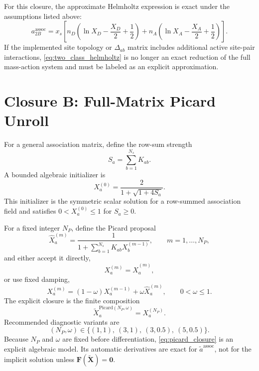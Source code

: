 \documentclass[12pt,letterpaper]{article}
\newcommand{\assoc}{\mathrm{assoc}}
\begin{document}
For this closure, the approximate Helmholtz expression is exact under the
assumptions listed above:
\begin{equation}
  a^\assoc_{2B}
  =
  x_s\left[
    n_D\left(\ln X_D-\frac{X_D}{2}+\frac{1}{2}\right)
    +
    n_A\left(\ln X_A-\frac{X_A}{2}+\frac{1}{2}\right)
  \right].
  \label{eq:two_class_helmholtz}
\end{equation}
If the implemented site topology or \(\Delta_{ab}\) matrix includes additional
active site-pair interactions, \eqref{eq:two_class_helmholtz} is no longer an
exact reduction of the full mass-action system and must be labeled as an
explicit approximation.

\section{Closure B: Full-Matrix Picard Unroll}
\label{sec:closure-b}

For a general association matrix, define the row-sum strength
\begin{equation}
  S_a = \sum_{b=1}^{N_s} K_{ab}.
  \label{eq:row_sum_strength}
\end{equation}
A bounded algebraic initializer is
\begin{equation}
  X_a^{(0)}
  =
  \frac{2}{1+\sqrt{1+4S_a}}.
  \label{eq:row_sum_initializer}
\end{equation}
This initializer is the symmetric scalar solution for a row-summed association
field and satisfies \(0<X_a^{(0)}\le 1\) for \(S_a\ge 0\).

For a fixed integer \(N_P\), define the Picard proposal
\begin{equation}
  \widehat{X}_a^{(m)}
  =
  \frac{1}{1+\sum_{b=1}^{N_s}K_{ab}X_b^{(m-1)}},
  \qquad m=1,\dots,N_P,
  \label{eq:picard_proposal}
\end{equation}
and either accept it directly,
\begin{equation}
  X_a^{(m)} = \widehat{X}_a^{(m)},
  \label{eq:undamped_picard}
\end{equation}
or use fixed damping,
\begin{equation}
  X_a^{(m)}
  =
  (1-\omega)X_a^{(m-1)}+\omega\widehat{X}_a^{(m)},
  \qquad 0<\omega\le 1.
  \label{eq:damped_picard}
\end{equation}
The explicit closure is the finite composition
\begin{equation}
  \widetilde{X}_a^{\mathrm{Picard}(N_P,\omega)}
  =
  X_a^{(N_P)}.
  \label{eq:picard_closure}
\end{equation}
Recommended diagnostic variants are
\begin{equation}
  (N_P,\omega)\in
  \{(1,1),\ (3,1),\ (3,0.5),\ (5,0.5)\}.
  \label{eq:picard_variants}
\end{equation}
Because \(N_P\) and \(\omega\) are fixed before differentiation,
\eqref{eq:picard_closure} is an explicit algebraic model. Its automatic
derivatives are exact for \(\widetilde{a}^{\assoc}\), not for the implicit
solution unless \(\mathbf{F}(\widetilde{\mathbf{X}})=\mathbf{0}\).
\end{document}
